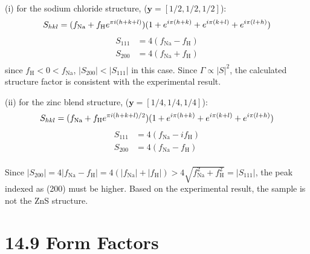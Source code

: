 \documentclass[a4paper,11pt]{article}
\begin{document}
(i) for the sodium chloride structure, ($\mathbf y=[1/2, 1/2, 1/2]$):
\begin{equation}
    S_{hkl}=(f_{\mathrm{Na}} + f_{\mathrm{H}}e^{\pi i(h+k+l)})(1+e^{i\pi(h+k)}+e^{i\pi(k+l)}+e^{i\pi(l+h)})\\
\end{equation}
\begin{align}
    S_{111}&=4(f_{\mathrm{Na}} - f_{\mathrm{H}})\\
    S_{200}&=4(f_{\mathrm{Na}} + f_{\mathrm{H}})\\
\end{align}
since $f_\mathrm H <0< f_{\mathrm{Na}}$, $|S_{200}|<|S_{111}|$ in this case. Since $\Gamma\propto |S|^2$, the calculated structure factor is consistent with the experimental result.


(ii) for the zinc blend structure, ($\mathbf y=[1/4, 1/4, 1/4]$):
\begin{equation}
    S_{hkl}=(f_{\mathrm{Na}} + f_{\mathrm{H}}e^{\pi i(h+k+l)/2})(1+e^{i\pi(h+k)}+e^{i\pi(k+l)}+e^{i\pi(l+h)})\\
\end{equation}
\begin{align}
    S_{111}&=4(f_{\mathrm{Na}} -i f_{\mathrm{H}})\\
    S_{200}&=4(f_{\mathrm{Na}} - f_{\mathrm{H}})\\
\end{align}

Since $|S_{200}|=4|f_{\mathrm{Na}} - f_{\mathrm{H}}|=4(|f_{\mathrm{Na}}|+|f_{\mathrm{H}}|)>4\sqrt{f_{\mathrm{Na}}^2 + f_{\mathrm{H}}^2}=|S_{111}|$, the peak indexed as (200) must be higher. Based on the experimental result, the sample is not the ZnS structure.  






\section{14.9 Form Factors}
\end{document}
